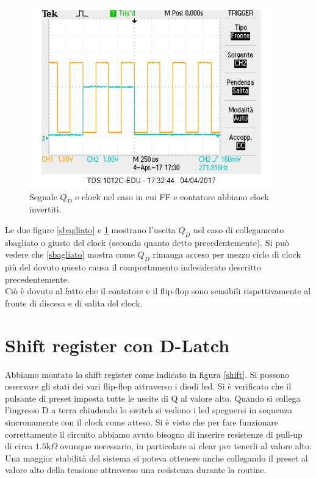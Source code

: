 \documentclass[10pt,a4paper]{article}
\begin{document}
\begin{figure}
\centering
\includegraphics[scale=1.0]{clockgiusto.png}
\caption{Segnale $Q_D$ e clock nel caso in cui FF e contatore abbiano clock invertiti.\label{giusto}}
\end{figure}

Le due figure \ref{sbagliato} e \ref{giusto} mostrano l'uscita $Q_D$ nel caso di collegamento sbagliato o giusto del clock (secondo quanto detto precedentemente). Si può vedere che \ref{sbagliato} mostra come $Q_D$ rimanga acceso per mezzo ciclo di clock più del dovuto questo causa il comportamento indesiderato descritto precedentemente.\\
Ciò è dovuto al fatto che il contatore e il flip-flop sono sensibili rispettivamente al fronte di discesa e di salita del clock.\\

\section{Shift register con D-Latch}
Abbiamo montato lo shift register come indicato in figura \ref{shift}. Si possono osservare gli stati dei vari flip-flop attraverso i diodi led. Si è verificato che il pulsante di preset imposta tutte le uscite di Q al valore alto. Quando si collega l'ingresso D a terra chiudendo lo switch si vedono i led spegnersi in sequenza sincronamente con il clock come atteso. Si è visto che per fare funzionare correttamente il circuito abbiamo avuto bisogno di inserire resistenze di pull-up di circa $1.5 \mbox{k}\Omega$ ovunque necessario, in particolare ai clear per tenerli al valore alto. Una maggior stabilità del sistema si poteva ottenere anche collegando il preset al valore alto della tensione attraverso una resistenza durante la routine.%
\end{document}

